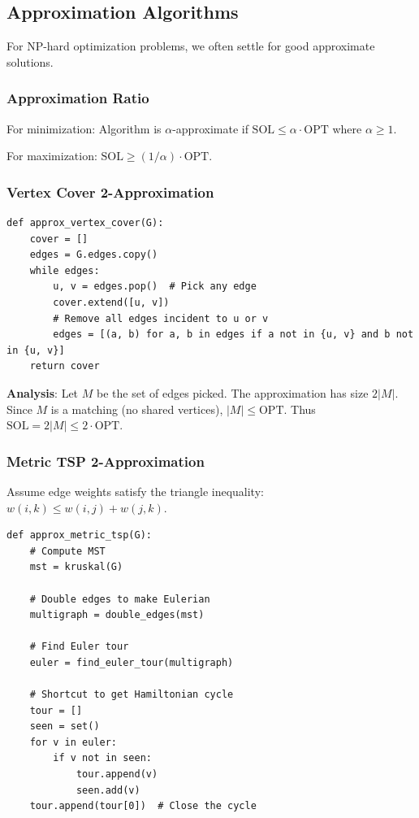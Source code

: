 \documentclass[11pt]{article}
\begin{document}
{{{\subsection*{Approximation Algorithms}

For NP-hard optimization problems, we often settle for good approximate solutions.

\subsubsection*{Approximation Ratio}
For minimization: Algorithm is $\alpha$-approximate if $\text{SOL} \le \alpha \cdot \text{OPT}$ where $\alpha \ge 1$.

For maximization: $\text{SOL} \ge (1/\alpha) \cdot \text{OPT}$.

\subsubsection*{Vertex Cover 2-Approximation}
\begin{lstlisting}
def approx_vertex_cover(G):
    cover = []
    edges = G.edges.copy()
    while edges:
        u, v = edges.pop()  # Pick any edge
        cover.extend([u, v])
        # Remove all edges incident to u or v
        edges = [(a, b) for a, b in edges if a not in {u, v} and b not in {u, v}]
    return cover
\end{lstlisting}

\textbf{Analysis}: Let $M$ be the set of edges picked. The approximation has size $2|M|$. Since $M$ is a matching (no shared vertices), $|M| \le \text{OPT}$. Thus $\text{SOL} = 2|M| \le 2 \cdot \text{OPT}$.

\subsubsection*{Metric TSP 2-Approximation}
Assume edge weights satisfy the triangle inequality: $w(i,k) \le w(i,j) + w(j,k)$.

\begin{lstlisting}
def approx_metric_tsp(G):
    # Compute MST
    mst = kruskal(G)
    
    # Double edges to make Eulerian
    multigraph = double_edges(mst)
    
    # Find Euler tour
    euler = find_euler_tour(multigraph)
    
    # Shortcut to get Hamiltonian cycle
    tour = []
    seen = set()
    for v in euler:
        if v not in seen:
            tour.append(v)
            seen.add(v)
    tour.append(tour[0])  # Close the cycle
    

\end{lstlisting}}}}
\end{document}
